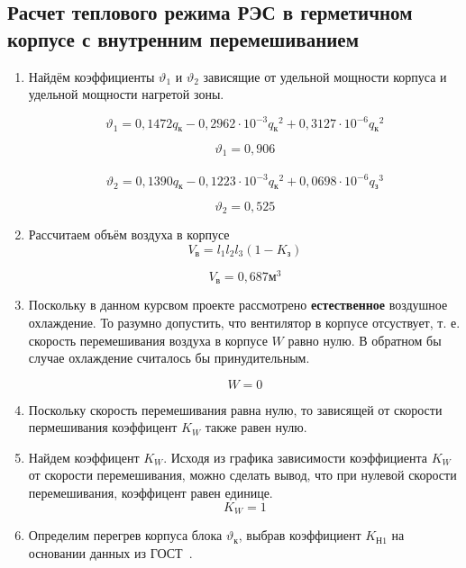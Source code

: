 \subsection{Расчет теплового режима РЭС в герметичном корпусе с внутренним перемешиванием}

\begin{enumerate}[label={\arabic*.}]
\item Найдём коэффициенты
$\vartheta_1$ и $\vartheta_2$ зависящие
от удельной мощности корпуса и удельной мощности нагретой зоны.

\begin{equation}
\vartheta_1 = 0,1472q\mathrm{_к} - 0,2962 \cdot 10^{-3}q\mathrm{_к}^2 + 0,3127 \cdot 10^{-6}q\mathrm{_к}^2
\end{equation}

$$\vartheta_1=0,906$$\\

\begin{equation}
\vartheta_2 = 0,1390q\mathrm{_к} - 0,1223 \cdot 10^{-3}q\mathrm{_к}^2 + 0,0698 \cdot 10^{-6}q\mathrm{_з}^3
\end{equation}

$$\vartheta_2 = 0,525$$

\item Рассчитаем объём воздуха в корпусе
  \begin{equation}
    V\mathrm{_в} = l_1 l_2 l_3 (1 - K\mathrm{_з})
  \end{equation}

  $$V\mathrm{_в} = 0,687\mathrm{м^3}$$
  \item Поскольку в данном курсвом
    проекте рассмотрено \textbf{естественное} воздушное охлаждение.
    То разумно допустить, что вентилятор в корпусе отсуствует, т. е.
    скорость перемешивания воздуха в корпусе $W$ равно нулю.
    В обратном бы случае охлаждение считалось бы принудительным.

    $$W = 0$$
    
    \item Поскольку скорость перемешивания равна нулю, то зависящей от
      скорости пермешивания коэффицент $K_W$ также равен нулю.
    \item Найдем коэффицент $K_W$. Исходя из графика зависимости
коэффициента $K_W$ от скорости перемешивания, можно сделать вывод, что
при нулевой скорости перемешивания, коэффицент равен единице.
$$K_W = 1$$

\item Определим перегрев корпуса блока $\vartheta\mathrm{_к}$,
  выбрав коэффициент $K\mathrm{_{Н1}}$ на основании данных из
  ГОСТ~\cite{GOST_15150-69}.


\end{enumerate}
